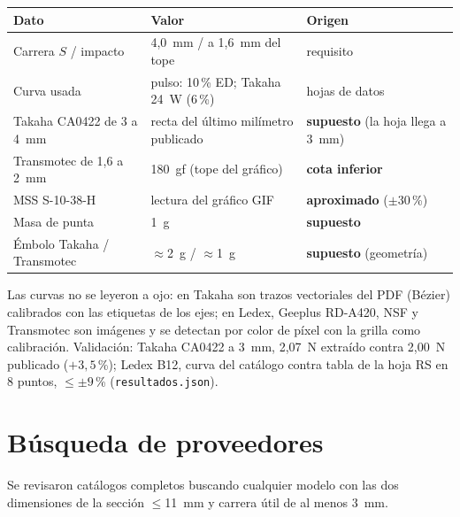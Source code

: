 \documentclass[11pt,a4paper]{article}
\begin{document}
\begin{table}[H]\centering\small
\begin{tabular}{p{4.2cm} p{5.3cm} p{5.1cm}}
\toprule
Dato & Valor & Origen\\
\midrule
Carrera $S$ / impacto & 4,0~mm / a 1,6~mm del tope & requisito\\
Curva usada & pulso: 10\,\% ED; Takaha 24~W (6\,\%) & hojas de datos\\
Takaha CA0422 de 3 a 4~mm & recta del último milímetro publicado & \textbf{supuesto} (la hoja llega a 3~mm)\\
Transmotec de 1,6 a 2~mm & 180~gf (tope del gráfico) & \textbf{cota inferior}\\
MSS S-10-38-H & lectura del gráfico GIF & \textbf{aproximado} ($\pm30$\,\%)\\
Masa de punta & 1~g & \textbf{supuesto}\\
Émbolo Takaha / Transmotec & $\approx$2~g / $\approx$1~g & \textbf{supuesto} (geometría)\\
\bottomrule
\end{tabular}
\end{table}

Las curvas no se leyeron a ojo: en Takaha son trazos vectoriales del PDF (Bézier) calibrados con las etiquetas
de los ejes; en Ledex, Geeplus RD-A420, NSF y Transmotec son imágenes y se detectan por color de píxel con la
grilla como calibración. Validación: Takaha CA0422 a 3~mm, 2,07~N extraído contra 2,00~N publicado ($+3{,}5$\,\%);
Ledex B12, curva del catálogo contra tabla de la hoja RS en 8 puntos, $\leq\pm9$\,\% (\texttt{resultados.json}).

\section{Búsqueda de proveedores}
Se revisaron catálogos completos buscando cualquier modelo con las dos dimensiones de la sección $\leq$11~mm y
carrera útil de al menos 3~mm.
\end{document}
